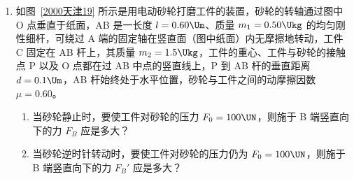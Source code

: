 \documentclass[\gkver]{gaokaozhenti}
\begin{document}
\begin{enumerate}


\item
如图~\ref{2000天津19} 所示是用电动砂轮打磨工件的装置，砂轮的转轴通过图中 O 点垂直于纸面，AB 是一长度 $l = 0.60\Um$、质量 $m_{1} = 0.50\Ukg$ 的均匀刚性细杆，可绕过 A 端的固定轴在竖直面（图中纸面）内无摩擦地转动，工件 C 固定在 AB 杆上，其质量 $m_{2} = 1.5\Ukg$，工件的重心、工件与砂轮的接触点 P 以及 O 点都在过 AB 中点的竖直线上，P 到 AB 杆的垂直距离 $d = 0.1\Um$，AB 杆始终处于水平位置，砂轮与工件之间的动摩擦因数 $\mu = 0.60$。

\begin{enumerate}
	\item
	当砂轮静止时，要使工件对砂轮的压力 $F_{0} = 100\UN$，则施于 B 端竖直向下的力 $F_{B}$ 应是多大？

	\item
	当砂轮逆时针转动时，要使工件对砂轮的压力仍为 $F_{0} = 100\UN$，则施于 B 端竖直向下的力 $F_{B}'$ 应是多大？
\end{enumerate}

\jdanswer{
\begin{enumerate}
	\item
	$40\UN$


\end{enumerate}}
\end{enumerate}
\end{document}
